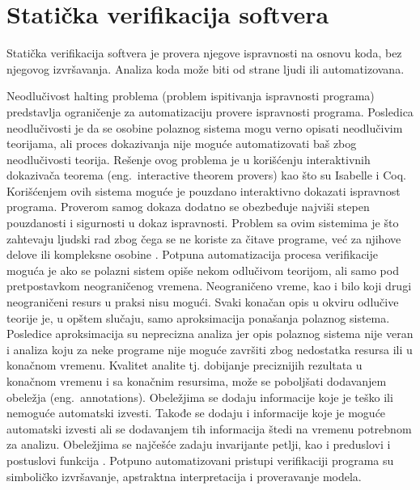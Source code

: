 \documentclass[12pt,oneside]{memoir}
\begin{document}


\section{Statička verifikacija softvera}
Statička verifikacija softvera je provera njegove ispravnosti na osnovu koda, bez njegovog izvršavanja. Analiza koda može biti od strane ljudi ili automatizovana. 



Neodlučivost halting problema (problem ispitivanja ispravnosti programa) predstavlja ograničenje za automatizaciju provere ispravnosti programa. Posledica neodlučivosti je da se osobine polaznog sistema mogu verno opisati neodlučivim teorijama, ali proces dokazivanja nije moguće automatizovati baš zbog neodlučivosti teorija. Rešenje ovog problema je u korišćenju interaktivnih dokazivača teorema (eng.~interactive theorem provers) kao što su Isabelle i Coq. Korišćenjem ovih sistema moguće je pouzdano interaktivno dokazati ispravnost programa. Proverom samog dokaza dodatno se obezbeđuje najviši stepen pouzdanosti i sigurnosti u dokaz ispravnosti. Problem sa ovim sistemima je što zahtevaju ljudski rad zbog čega se ne koriste za čitave programe, već za njihove delove ili kompleksne osobine \cite{mvj}. 
Potpuna automatizacija procesa verifikacije moguća je ako se polazni sistem opiše nekom odlučivom teorijom, ali samo pod pretpostavkom neograničenog vremena. Neograničeno vreme, kao i bilo koji drugi neograničeni resurs u praksi nisu mogući. Svaki konačan opis u okviru odlučive teorije je, u opštem slučaju, samo aproksimacija ponašanja polaznog sistema. Posledice aproksimacija su neprecizna analiza jer opis polaznog sistema nije veran i analiza koju za neke programe nije moguće završiti zbog nedostatka resursa ili u konačnom vremenu. 
Kvalitet analite tj. dobijanje preciznijih rezultata u konačnom vremenu i sa konačnim resursima, može se poboljšati dodavanjem obeležja (eng.~annotations). Obeležjima se dodaju informacije koje je teško ili nemoguće automatski izvesti. Takođe se dodaju i informacije koje je moguće automatski izvesti ali se dodavanjem tih informacija štedi na vremenu potrebnom za analizu. Obeležjima se najčešće zadaju invarijante petlji, kao i preduslovi i postuslovi funkcija \cite{mvj}. 
Potpuno automatizovani pristupi verifikaciji programa su simboličko izvršavanje, apstraktna interpretacija i proveravanje modela. 
\end{document}
